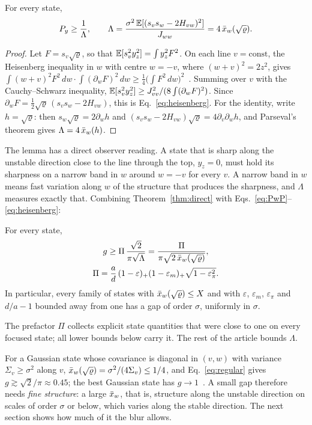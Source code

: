 \begin{lemma}
\label{lem:heisenberg}
For every state,
\begin{equation}
P_y \geq \frac{1}{\Lambda}, \qquad \Lambda = \frac{\sigma^2\,\mathbb{E}[(s_v s_w - 2H_{vw})^2]}{J_{ww}} = 4\,\bar{x}_w(\sqrt{\varrho}).
\label{eq:heisenberg}
\end{equation}
\end{lemma}

\begin{proof}
Let $F = s_v\sqrt{\varrho}$, so that $\mathbb{E}[s_v^2 y_z^2] = \int y_z^2 F^2$. On each line $v = \text{const}$, the Heisenberg inequality in $w$ with centre $w = -v$, where $(w + v)^2 = 2z^2$, gives $\int (w+v)^2 F^2\,dw \cdot \int (\partial_w F)^2\,dw \geq \frac14 \big(\int F^2\,dw\big)^2$~\cite{folland1997}. Summing over $v$ with the Cauchy--Schwarz inequality, $\mathbb{E}[s_v^2 y_z^2] \geq J_{vv}^2/(8\int(\partial_w F)^2)$. Since $\partial_w F = \frac12\sqrt{\varrho}\,(s_v s_w - 2H_{vw})$, this is Eq.~\eqref{eq:heisenberg}. For the identity, write $h = \sqrt\varrho$: then $s_w\sqrt\varrho = 2\partial_w h$ and $(s_v s_w - 2H_{vw})\sqrt{\varrho} = 4\partial_v\partial_w h$, and Parseval's theorem gives $\Lambda = 4\,\bar{x}_w(h)$.
\end{proof}

The lemma has a direct observer reading. A state that is sharp along the unstable direction close to the line through the top, $y_z = 0$, must hold its sharpness on a narrow band in $w$ around $w = -v$ for every $v$. A narrow band in $w$ means fast variation along $w$ of the structure that produces the sharpness, and $\Lambda$ measures exactly that. Combining Theorem~\ref{thm:direct} with Eqs.~\eqref{eq:PwP}--\eqref{eq:heisenberg}:

\begin{corollary}
\label{cor:regular}
For every state,
\begin{gather}
g \geq \Pi\,\frac{\sqrt2}{\pi\sqrt{\Lambda}} = \frac{\Pi}{\pi\sqrt{2\,\bar{x}_w(\sqrt\varrho)}}, \label{eq:regular}\\
\Pi = \frac{a}{d}\,(1 - \varepsilon)_+(1 - \varepsilon_m)_+\sqrt{1 - \varepsilon_\pi^2} . \nonumber
\end{gather}
In particular, every family of states with $\bar{x}_w(\sqrt\varrho) \leq X$ and with $\varepsilon$, $\varepsilon_m$, $\varepsilon_\pi$ and $d/a - 1$ bounded away from one has a gap of order $\sigma$, uniformly in $\sigma$.
\end{corollary}

The prefactor $\Pi$ collects explicit state quantities that were close to one on every focused state; all lower bounds below carry it. The rest of the article bounds $\Lambda$.

For a Gaussian state whose covariance is diagonal in $(v,w)$ with variance $\Sigma_v \geq \sigma^2$ along $v$, $\bar{x}_w(\sqrt\varrho) = \sigma^2/(4\Sigma_v) \leq 1/4$, and Eq.~\eqref{eq:regular} gives $g \gtrsim \sqrt2/\pi \approx 0.45$; the best Gaussian state has $g \to 1$~\cite{namba2026gap}. A small gap therefore needs \emph{fine structure}: a large $\bar{x}_w$, that is, structure along the unstable direction on scales of order $\sigma$ or below, which varies along the stable direction. The next section shows how much of it the blur allows.
